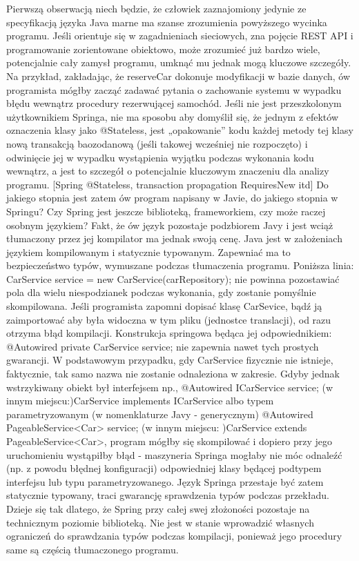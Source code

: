 Pierwszą obserwacją niech będzie, że człowiek zaznajomiony jedynie ze specyfikacją języka Java marne ma szanse zrozumienia powyższego wycinka programu. Jeśli orientuje się w zagadnieniach sieciowych, zna pojęcie REST API i programowanie zorientowane obiektowo, może zrozumieć już bardzo wiele, potencjalnie cały zamysł programu, umknąć mu jednak mogą kluczowe szczegóły. Na przykład, zakładając, że reserveCar dokonuje modyfikacji w bazie danych, ów programista mógłby zacząć zadawać pytania o zachowanie systemu w wypadku błędu wewnątrz procedury rezerwującej samochód. Jeśli nie jest przeszkolonym użytkownikiem Springa, nie ma sposobu aby domyślił się, że jednym z efektów oznaczenia klasy jako @Stateless, jest „opakowanie” kodu każdej metody tej klasy nową transakcją baozodanową (jeśli takowej wcześniej nie rozpoczęto) i odwinięcie jej w wypadku wystąpienia wyjątku podczas wykonania kodu wewnątrz, a jest to szczegół o potencjalnie kluczowym znaczeniu dla analizy programu. [Spring @Stateless, transaction propagation RequiresNew itd]
Do jakiego stopnia jest zatem ów program napisany w Javie, do jakiego stopnia w Springu? Czy Spring jest jeszcze biblioteką, frameworkiem, czy może raczej osobnym językiem? Fakt, że ów język pozostaje podzbiorem Javy i jest wciąż tłumaczony przez jej kompilator ma jednak swoją cenę. 
Java jest w założeniach językiem kompilowanym i statycznie typowanym. Zapewniać ma to bezpieczeństwo typów, wymuszane podczas tłumaczenia programu. Poniższa linia:
    CarService service = new CarService(carRepository);
nie powinna pozostawiać pola dla wielu niespodzianek podczas wykonania, gdy zostanie pomyślnie skompilowana.
Jeśli programista zapomni dopisać klasę CarSevice, bądź ją zaimportować aby była widoczna w tym pliku (jednostce translacji), od razu otrzyma błąd kompilacji.
Konstrukcja springowa będąca jej odpowiednikiem:
@Autowired private CarService service;
nie zapewnia nawet tych prostych gwarancji. W podstawowym przypadku, gdy CarService fizycznie nie istnieje, faktycznie, tak samo nazwa nie zostanie odnaleziona w zakresie. Gdyby jednak wstrzykiwany obiekt był interfejsem np., 
@Autowired ICarService service; 
(w innym miejscu:)CarService implements ICarService
albo typem parametryzowanym (w nomenklaturze Javy - generycznym)
@Autowired PageableService<Car> service; 
(w innym miejscu: )CarService extends PageableService<Car>,
program mógłby się skompilować i dopiero przy jego uruchomieniu wystąpiłby błąd - maszyneria Springa mogłaby nie móc odnaleźć (np. z powodu błędnej konfiguracji) odpowiedniej klasy będącej podtypem interfejsu lub typu parametryzowanego.
Język Springa przestaje być zatem statycznie typowany, traci gwarancję sprawdzenia typów podczas przekładu. Dzieje się tak dlatego, że Spring przy całej swej złożoności pozostaje na technicznym poziomie biblioteką. Nie jest w stanie wprowadzić własnych ograniczeń do sprawdzania typów podczas kompilacji, ponieważ jego procedury same są częścią tłumaczonego programu. 


